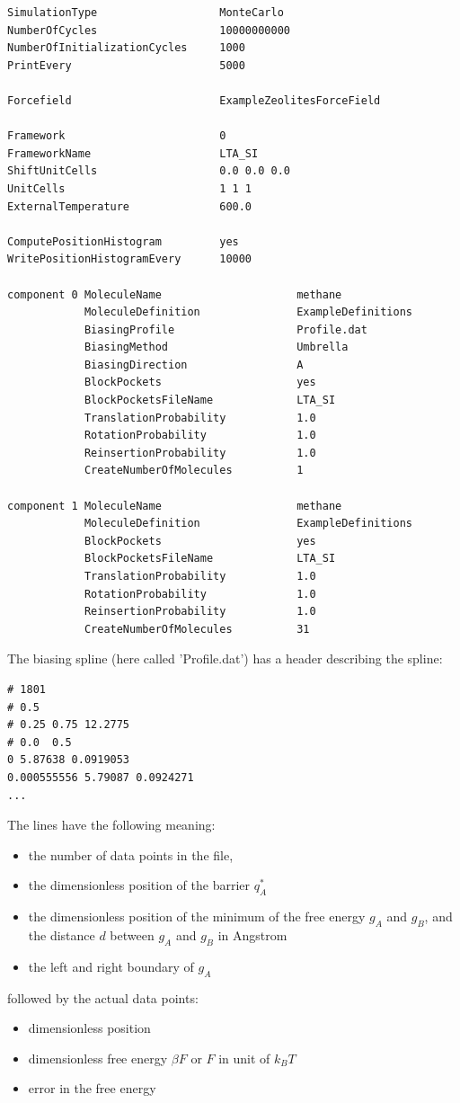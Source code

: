 \begin{tiny}
\begin{verbatim}
SimulationType                   MonteCarlo
NumberOfCycles                   10000000000
NumberOfInitializationCycles     1000
PrintEvery                       5000

Forcefield                       ExampleZeolitesForceField

Framework                        0
FrameworkName                    LTA_SI
ShiftUnitCells                   0.0 0.0 0.0
UnitCells                        1 1 1
ExternalTemperature              600.0

ComputePositionHistogram         yes
WritePositionHistogramEvery      10000

component 0 MoleculeName                     methane
            MoleculeDefinition               ExampleDefinitions
            BiasingProfile                   Profile.dat
            BiasingMethod                    Umbrella
            BiasingDirection                 A
            BlockPockets                     yes
            BlockPocketsFileName             LTA_SI
            TranslationProbability           1.0
            RotationProbability              1.0
            ReinsertionProbability           1.0
            CreateNumberOfMolecules          1

component 1 MoleculeName                     methane
            MoleculeDefinition               ExampleDefinitions
            BlockPockets                     yes
            BlockPocketsFileName             LTA_SI
            TranslationProbability           1.0
            RotationProbability              1.0
            ReinsertionProbability           1.0
            CreateNumberOfMolecules          31
\end{verbatim}
\end{tiny}

The biasing spline (here called 'Profile.dat') has a header describing the spline:
\begin{tiny}
\begin{verbatim}
# 1801
# 0.5
# 0.25 0.75 12.2775
# 0.0  0.5
0 5.87638 0.0919053
0.000555556 5.79087 0.0924271
...
\end{verbatim}
\end{tiny}
The lines have the following meaning:
\begin{itemize}
\item{the number of data points in the file},
\item{the dimensionless position of the barrier $q^*_A$}
\item{the dimensionless position of the minimum of the free energy $g_A$ and $g_B$, and the distance $d$ between $g_A$ and $g_B$ in Angstrom}
\item{the left and right boundary of $g_A$}
\end{itemize}
followed by the actual data points: 
\begin{itemize}
\item{dimensionless position}
\item{dimensionless free energy $\beta F$ or $F$ in unit of $k_BT$}
\item{error in the free energy}
\end{itemize}


